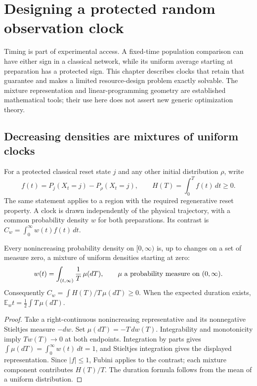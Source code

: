 \chapter{Designing a protected random observation clock}
\label{rr:clock}

Timing is part of experimental access. A fixed-time population comparison can
have either sign in a classical network, while its uniform average starting at
preparation has a protected sign. This chapter describes clocks that retain
that guarantee and makes a limited resource-design problem exactly solvable.
The mixture representation and linear-programming geometry are established
mathematical tools; their use here does not assert new generic optimization
theory.

\section{Decreasing densities are mixtures of uniform clocks}
For a protected classical reset state $j$ and any other initial distribution
$\rho$, write
\[
 f(t)=P_j(X_t=j)-P_\rho(X_t=j),\qquad
 H(T)=\int_0^T f(t)\,dt\geq0.
\]
The same statement applies to a region with the required regenerative reset
property. A clock is drawn independently of the physical trajectory, with a
common probability density $w$ for both preparations. Its contrast is
$C_w=\int_0^\infty w(t)f(t)\,dt$.

\begin{proposition}
Every nonincreasing probability density on $[0,\infty)$ is, up to changes on
a set of measure zero, a mixture of uniform densities starting at zero:
\[
 w(t)=\int_{(t,\infty)}\frac{1}{T}\,\mu(dT),\qquad
 \mu\ \hbox{a probability measure on }(0,\infty).
\]
Consequently $C_w=\int H(T)/T\,\mu(dT)\geq0$. When the expected duration
exists, $\mathbb E_w t=\frac12\int T\,\mu(dT)$.
\end{proposition}
\begin{proof}
Take a right-continuous nonincreasing representative and its nonnegative
Stieltjes measure $-dw$. Set $\mu(dT)=-T\,dw(T)$. Integrability and
monotonicity imply $T w(T)\to0$ at both endpoints. Integration by parts gives
$\int\mu(dT)=\int_0^\infty w(t)\,dt=1$, and Stieltjes integration gives
the displayed representation. Since $|f|\leq1$, Fubini applies to the contrast;
each mixture component contributes $H(T)/T$. The duration formula follows
from the mean of a uniform distribution.
\end{proof}

